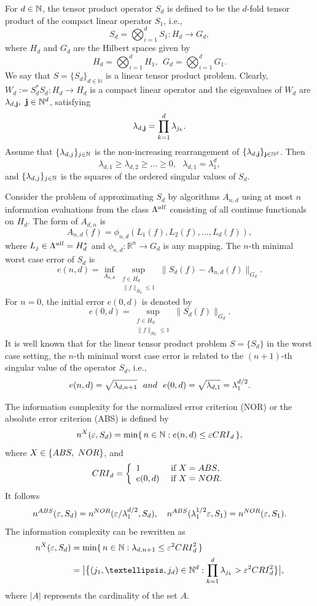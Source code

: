\documentclass[10pt,a4paper]{amsart}
\numberwithin{equation}{section}
\def\vz{\varepsilon}
\def\lz{\lambda}
\newcommand{\NN}{\mathbb{N}}
\newcommand{\bsj}{\oldsymbol{j}}
\def\NN{{\mathbb N}}
\def\RR{{\mathbb R}}
\def\bsj{{\bf j}}
\begin{document}
 For $d\in \Bbb N$, the tensor product operator $S_{d}$ is defined
 to be the $d$-fold tensor product of the
compact linear operator $S_1$, i.e.,
$$S_{d}=\bigotimes_{i=1}^d S_{1}: H_{d}\to G_d,$$
where $H_{d}$ and $G_d$ are the Hilbert spaces given by
$$H_{d}=\bigotimes_{i=1}^dH_{1},\ \
G_d=\bigotimes_{i=1}^d G_1.$$
 We say that $S = \{S_d\}_{d\in\NN}$ is a linear tensor
product problem. Clearly, $W_{d}:=S_{d}^*S_{d}: H_{d}\to H_{d} $
is a compact linear operator and the eigenvalues of $W_{d}$ are
$\lz_{d,\bsj},\ {\bsj\in\NN^d}$, satisfying
$$\lz_{d,\bsj}=\prod_{k=1}^d \lz_{j_k}.$$
Assume that $\{\lambda_{d,j}\}_{j\in\Bbb N}$ is the non-increasing
rearrangement of $\{\lz_{d,\bsj}\}_{\bsj\in \Bbb N^d}$. Then
$$\lz_{d,1}\ge \lz_{d,2}\ge \dots \ge 0, \ \ \
\lz_{d,1}=\lz_1^d,$$and $\{\lz_{d,j}\}_{j\in\Bbb N}$ is the
squares of the ordered singular values of $S_d$.


Consider the problem of approximating $S_d$ by algorithms
$A_{n,d}$ using at most $n$ information evaluations from the class
$\Lambda^{\rm all}$ consisting of all continue functionals on
$H_d$.
 The form of $A_{d,n}$ is
$$
A_{n,d}(f)=\phi_{n,d}(L_1(f),L_2(f),\dots,L_d(f)),
$$
where $L_j\in \Lambda^{\rm all }=H_d^*$ and $\phi_{n,d}:\RR^n \to
G_d$ is any mapping. The $n$-th minimal worst case error of $S_d$
is
$$e(n,d)=\inf_{A_{n,d}}\sup_{\substack{f \in H_{d}\\ \|f\|_{H_{d} } \le
1}}\|S_{d}(f)-A_{n,d}(f)\|_{G_d}.$$ For $n=0$, the initial error
$e(0,d)$ is denoted by
$$ e(0,d)=\sup_{\substack{  f \in H_{d} \\ \|f\|_{H_{d}} \le 1}}\|S_{d}(f)\|_{G_d}.$$
It is well known that for the linear tensor product problem
$S=\{S_d\}$ in the worst case setting, the $n$-th minimal worst
case error is related to the $(n+1)$-th  singular value of the
operator $S_d$, i.e.,
$$e(n,d)=\sqrt{\lambda_{d,n+1}} \ \ {\rm and }\ \  e(0,d)=\sqrt{\lz_{d,1}}=\lz_1^{d/2}.$$



 The information complexity for the normalized error criterion  (NOR)
or the absolute error criterion (ABS) is defined by
\begin{equation*}
n^X(\vz,S_{d})=
\min\{\,n\in \NN : e(n,d) \le  \varepsilon {\rm CRI}_d\,\},
\end{equation*}
where $X\in\{{\rm ABS,\ NOR}\}$, and
$${\rm CRI}_d=\left\{
\begin{array}{ll}
1 & \mbox{ if } X={\rm ABS},\\
e(0,d) & \mbox{ if } X={\rm NOR}.
\end{array}\right.$$
 It follows
$$n^{\rm ABS}(\vz,S_d)=n^{\rm NOR}({\vz}/{\lz_1^{d/2}},S_d),\ \ \ n^{\rm ABS}(\lz_1^{1/2}\vz,S_1)=n^{\rm NOR}(\vz,S_1).$$
 The information complexity can be rewritten
as
\begin{align}\label{1.1}
n^X(\vz,S_{d})&=\min\{\,n\in \NN : \lambda_{d,n+1}\le  \varepsilon^2 {\rm CRI}^2_d\,\}\notag\\
&= \big|\big\{(j_1,\dots,j_d) \in \NN^d : \prod_{k=1}^d\lz_{j_k}>
\varepsilon^2 {\rm CRI}^2_d \big\}\big|,
\end{align}where $| A |$
represents the cardinality of the set $A$.
\end{document}
